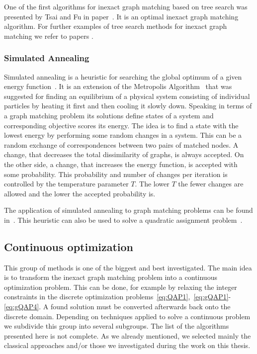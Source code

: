 One of the first algorithms for inexact graph matching based on tree search was presented by Tsai and Fu in paper~\cite{Fu1979}. It is an optimal inexact graph matching algorithm. For further examples of tree search methods for inexact graph matching we refer to papers \cite{Bunke1983_inexactGM,Shapiro1981,Wang1995}.
\subsubsection{Simulated Annealing}
Simulated annealing is a heuristic for searching the global optimum of a given energy function~\cite{Burkard98thequadratic}. It is an extension of the Metropolis Algorithm~\cite{Metropolis} that was suggested for finding an equilibrium of a physical system consisting of individual particles by heating it first and then cooling it slowly down. Speaking in terms of a graph matching problem its solutions define states of a system and corresponding objective scores its energy. The idea is to find a state with the lowest energy by performing some random changes in a system. This can be a random exchange of correspondences between two pairs of matched nodes. A change, that decreases the total dissimilarity of graphs, is always accepted. On the other side, a change, that increases the energy function, is accepted with some probability. This probability and number of changes per iteration is controlled by the temperature parameter $T$. The lower $T$ the fewer changes are allowed and the lower the accepted probability is. 

The application of simulated annealing to graph matching problems can be found in~\cite{Herault1990_SimulatedAnnealing}. This heuristic can also be used to solve a quadratic assignment problem~\cite{Burkard98thequadratic}.
\subsection{Continuous optimization}
This group of methods is one of the biggest and best investigated. The main idea is to transform the inexact graph matching problem into a continuous optimization problem. This can be done, for example by relaxing the integer constraints in the discrete optimization problems~\eqref{eq:QAP1},~\eqref{eq:gQAP1}-\eqref{eq:gQAP4}. A found solution must be converted afterwards back onto the discrete domain. Depending on techniques applied to solve a continuous problem we subdivide this group into several subgroups. The list of the algorithms presented here is not complete. As we already mentioned, we selected mainly the classical approaches and/or those we investigated during the work on this thesis.

